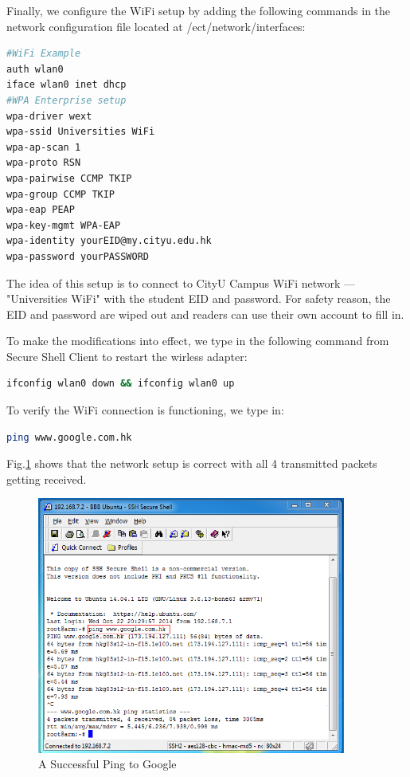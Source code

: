 \documentclass[12pt,journal,draftclsnofoot,onecolumn]{IEEEtran}
\begin{document}
Finally, we configure the WiFi setup by adding the following commands in the network configuration file located at /ect/network/interfaces:
\begin{lstlisting}[language={bash}]
#WiFi Example
auth wlan0
iface wlan0 inet dhcp
#WPA Enterprise setup
wpa-driver wext
wpa-ssid Universities WiFi
wpa-ap-scan 1
wpa-proto RSN
wpa-pairwise CCMP TKIP
wpa-group CCMP TKIP
wpa-eap PEAP
wpa-key-mgmt WPA-EAP
wpa-identity yourEID@my.cityu.edu.hk
wpa-password yourPASSWORD
\end{lstlisting}
The idea of this setup is to connect to CityU Campus WiFi network --- "Universities WiFi" with the student EID and password. For safety reason, the EID and password are wiped out and readers can use their own account to fill in.



To make the modifications into effect, we type in the following command from Secure Shell Client to restart the wirless adapter:
\begin{lstlisting}[language={bash}]
ifconfig wlan0 down && ifconfig wlan0 up
\end{lstlisting}
 To verify the WiFi connection is functioning, we type in:
\begin{lstlisting}[language={bash}]
ping www.google.com.hk
\end{lstlisting}
Fig.\ref{ping} shows that the network setup is correct with all 4 transmitted packets getting received.

\begin{figure}[htb]
	\centering
	\includegraphics[width=4in]{./figs/ping.PNG}
	\caption{A Successful Ping to Google}
	\label{ping}
\end{figure}
\end{document}
